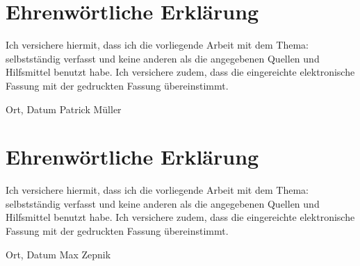 
\chapter*{Ehrenwörtliche Erklärung}


Ich versichere hiermit, dass ich die vorliegende Arbeit
 mit dem Thema: \textit{\DerTitelDerArbeit} selbstständig verfasst und keine anderen als die angegebenen Quellen und
Hilfsmittel benutzt habe. Ich versichere zudem,
dass die eingereichte elektronische Fassung mit der gedruckten Fassung übereinstimmt.

\vspace{3cm}
Ort, Datum \hfill Patrick Müller
\vspace{5cm}
\chapter*{Ehrenwörtliche Erklärung}


Ich versichere hiermit, dass ich die vorliegende Arbeit
 mit dem Thema: \textit{\DerTitelDerArbeit} selbstständig verfasst und keine anderen als die angegebenen Quellen und
Hilfsmittel benutzt habe. Ich versichere zudem,
dass die eingereichte elektronische Fassung mit der gedruckten Fassung übereinstimmt.

\vspace{3cm}
Ort, Datum \hfill Max Zepnik